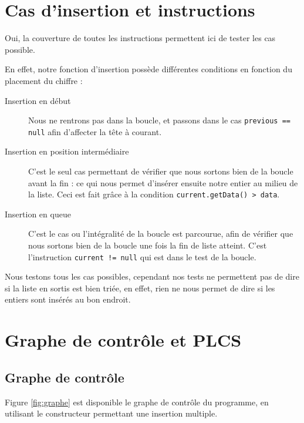 \documentclass[a4paper, 11pt]{article}
\begin{document}
	\section{Cas d'insertion et instructions}
	Oui, la couverture de toutes les instructions permettent ici de tester les cas possible.

	En effet, notre fonction d'insertion possède différentes conditions en fonction du placement du chiffre :

	\begin{description}
		\item[Insertion en début] Nous ne rentrons pas dans la boucle, et passons dans le cas \texttt{previous == null} afin d'affecter la tête
			à courant.
		\item[Insertion en position intermédiaire] C'est le seul cas permettant de vérifier que nous sortons bien de la boucle avant la fin : 
			ce qui nous permet d'insérer ensuite notre entier au milieu de la liste. Ceci est fait grâce à la condition \texttt{current.getData() > data}.
		\item[Insertion en queue] C'est le cas ou l'intégralité de la boucle est parcourue, afin de vérifier que nous sortons bien de la boucle une
			fois la fin de liste atteint. C'est l'instruction \texttt{current != null} qui est dans le test de la boucle.
	\end{description}

	Nous testons tous les cas possibles, cependant nos tests ne permettent pas de dire si la liste en sortis est bien triée, en effet, rien ne nous
	permet de dire si les entiers sont insérés au bon endroit.

	\section{Graphe de contrôle et PLCS}
	\subsection{Graphe de contrôle}
	Figure \ref{fig:graphe} est disponible le graphe de contrôle du programme, en utilisant le constructeur permettant une insertion multiple.
\end{document}
